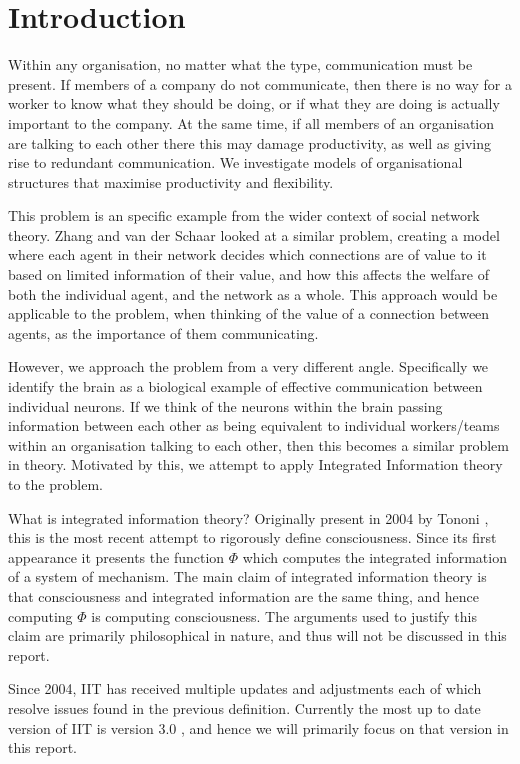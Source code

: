  


\section{Introduction}
Within any organisation, no matter what the type, communication must be present. If members of a company do not communicate, then there is no way for a worker to know what they should be doing, or if what they are doing is actually important to the company. At the same time, if all members of an organisation are talking to each other there this may damage productivity, as well as giving rise to redundant communication. We investigate models of organisational structures that maximise productivity and flexibility.

This problem is an specific example from the wider context of social network theory. Zhang and van der Schaar \cite{zhang2015reputational} looked at a similar problem,  creating a model where each agent in their network decides which connections are of value to it based on limited information of their value, and how this affects the welfare of both the individual agent, and the network as a whole. This approach would be applicable to the problem, when thinking of the value of a connection between agents, as the importance of them communicating.

However, we approach the problem from a very different angle. Specifically we identify the brain as a biological example of effective communication between individual neurons. If we think of the neurons within the brain passing information between each other as being equivalent to individual workers/teams within an organisation talking to each other, then this becomes a similar problem in theory. Motivated by this, we attempt to apply Integrated Information theory to the problem.

What is integrated information theory? Originally present in 2004 by Tononi \cite{tononi2004information}, this is the most recent attempt to rigorously define consciousness. Since its first appearance it presents the function $\Phi$ which computes the integrated information of a system of mechanism. The main claim of integrated information theory is that consciousness and integrated information are the same thing, and hence computing $\Phi$ is computing consciousness. The arguments used to justify this claim are primarily philosophical in nature, and thus will not be discussed in this report. 

Since 2004, IIT has received multiple updates and adjustments \cite{tononi2011integrated,balduzzi2008integrated,tononi2016consciousness} each of which resolve issues found in the previous definition. Currently the most up to date version of IIT is version 3.0 \cite{oizumi2014phenomenology}, and hence we will primarily focus on that version in this report.

